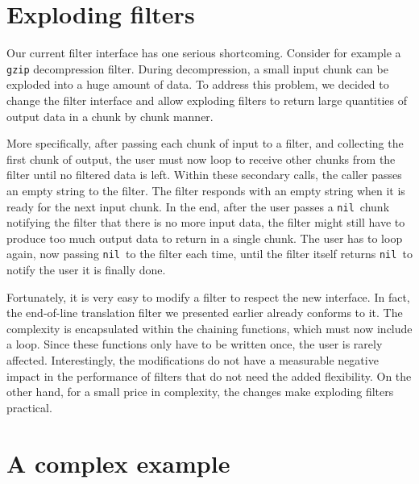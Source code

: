 \documentclass[10pt]{article}
\newcommand{\nil}{\texttt{nil}}
\begin{document}
\section{Exploding filters}

Our current filter interface has one serious shortcoming.
Consider for example a \texttt{gzip} decompression filter.
During decompression, a small input chunk can be exploded
into a huge amount of data. To address this problem, we
decided to change the filter interface and allow exploding
filters to return large quantities of output data in a chunk
by chunk manner.

More specifically, after passing each chunk of input to
a filter, and collecting the first chunk of output, the
user must now loop to receive other chunks from the filter until no
filtered data is left. Within these secondary calls, the
caller passes an empty string to the filter. The filter
responds with an empty string when it is ready for the next
input chunk. In the end, after the user passes a
\nil\ chunk notifying the filter that there is no
more input data, the filter might still have to produce too
much output data to return in a single chunk. The user has
to loop again, now passing \nil\ to the filter each time,
until the filter itself returns \nil\ to notify the
user it is finally done.

Fortunately, it is very easy to modify a filter to respect
the new interface. In fact, the end-of-line translation
filter we presented earlier already conforms to it.  The
complexity is encapsulated within the chaining functions,
which must now include a loop. Since these functions only
have to be written once, the user is rarely affected.
Interestingly, the modifications do not have a measurable
negative impact in the performance of filters that do
not need the added flexibility. On the other hand, for a
small price in complexity, the changes make exploding
filters practical.

\section{A complex example}
\end{document}
